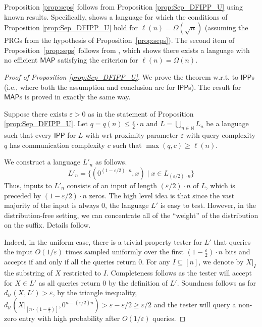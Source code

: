 \documentclass[11pt]{article}
\newcommand{\IPP}{\mathsf{IPP}}
\newcommand{\MAP}{\mathsf{MAP}}
\newcommand{\sU}{\mathcal{U}}
\begin{document}
Proposition \ref{prop:seps} follows from Proposition \ref{prop:Sep_DFIPP_U} using known results. Specifically, \cite[Theorem 4]{KR15} shows a language for which the conditions of Proposition \ref{prop:Sep_DFIPP_U} hold for $\ell(n)=\Omega(\sqrt{n})$ (assuming the PRGs from the hypothesis of Proposition~\ref{prop:seps}). The second item of Proposition~\ref{prop:seps} follows from  \cite[Theorem 4]{GR18}, which shows there exists a language with no efficient $\MAP$ satisfying the criterion for $\ell(n)=\Omega(n)$. 

\begin{proof}[Proof of Proposition \ref{prop:Sep_DFIPP_U}]
    We prove the theorem w.r.t. to $\IPP$s (i.e., where both the assumption and conclusion are for $\IPP$s). The result for $\MAP$s is proved in exactly the same way.

    Suppose there exists $\varepsilon>0$ as in the statement of Proposition \ref{prop:Sep_DFIPP_U}. Let $q=q(n) \leq \frac{\varepsilon}{2}\cdot n$ and $L=\bigcup_{n\in\mathbb{N}} L_{n}$ be a language such that every $\IPP$ for $L$ with wrt proximity parameter $\varepsilon$ with query complexity $q$ has communication complexity $c$ such that $\max(q,c) \geq \ell(n)$. 
    
  
    We construct a language $L'_{n}$ as follows.
    \begin{equation*}
        L'_{n}= \big\{(0^{(1-\varepsilon/2) \cdot n},x) \;\vert\; x\in L_{(\varepsilon/2) \cdot n} \big\}
    \end{equation*}
    Thus, inputs to $L'_n$ consists of an input of length $(\varepsilon/2) \cdot n$ of $L$, which is preceded by $(1-\varepsilon/2) \cdot n$ zeros. The high level idea is that since the vast majority of the input is always $0$, the language $L'$ is easy to test. However, in the distribution-free setting, we can concentrate all of the ``weight'' of the distribution on the suffix. Details follow.

    Indeed, in the uniform case, there is a trivial property tester for $L'$ that queries the input $O(1/\varepsilon)$ times sampled uniformly over the first $\left(1-\frac{\varepsilon}{2}\right) \cdot n$ bits and accepts if and only if all the queries return $0$.
    For any $I\subseteq [n]$, we denote by $X\vert_{I}$ the substring of $X$ restricted to $I$.  Completeness follows as the tester will accept for $X\in L'$ as all queries return $0$ by the definition of $L'$. Soundness follows as for $d_{\sU}(X,L')>\varepsilon$, by the triangle inequality, $d_{\sU}(X\vert_{\left[n\cdot\left(1-\frac{\varepsilon}{2}\right)\right]},0^{n-(\varepsilon/2)n})>\varepsilon-\varepsilon/2\geq\varepsilon/2$ and the tester will query a non-zero entry with high probability after $O(1/\varepsilon)$ queries.


\end{proof}
\end{document}
